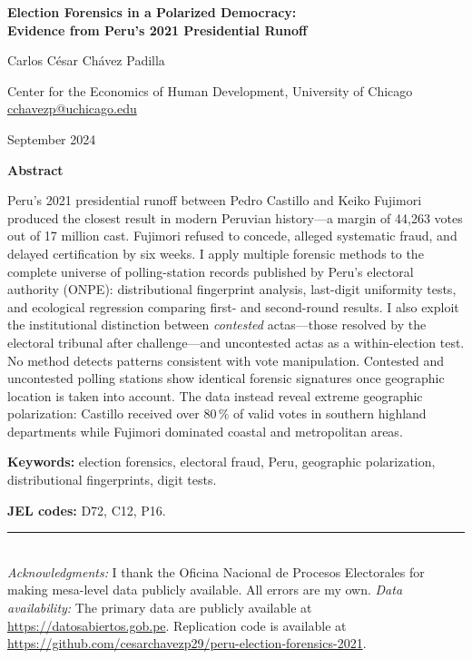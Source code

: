 \documentclass[12pt]{article}
\begin{document}
\thispagestyle{empty}

\begin{center}
\vspace*{1.5cm}
{\LARGE\bfseries Election Forensics in a Polarized Democracy:\\[10pt]
Evidence from Peru's 2021 Presidential Runoff\par}
\vspace{1.5cm}
{\large Carlos C\'esar Ch\'avez Padilla\par}
\vspace{0.4cm}
{\normalsize
  Center for the Economics of Human Development, University of Chicago\\[4pt]
  \href{mailto:cchavezp@uchicago.edu}{cchavezp@uchicago.edu}
\par}
\vspace{0.5cm}
{\normalsize September 2024\par}
\end{center}

\vspace{0.8cm}
\begin{center}\textbf{Abstract}\end{center}
\noindent\small
Peru's 2021 presidential runoff between Pedro Castillo and Keiko Fujimori
produced the closest result in modern Peruvian history---a margin of 44,263
votes out of 17 million cast. Fujimori refused to concede, alleged systematic
fraud, and delayed certification by six weeks. I apply multiple forensic
methods to the complete universe of polling-station records published by
Peru's electoral authority (ONPE): distributional fingerprint analysis,
last-digit uniformity tests, and ecological regression comparing first- and
second-round results. I also exploit the institutional distinction between
\emph{contested} actas---those resolved by the electoral tribunal after
challenge---and uncontested actas as a within-election test. No method
detects patterns consistent with vote manipulation. Contested and uncontested
polling stations show identical forensic signatures once geographic location
is taken into account. The data instead reveal extreme geographic polarization:
Castillo received over 80\,\% of valid votes in southern highland departments
while Fujimori dominated coastal and metropolitan areas.

\medskip
\noindent\textbf{Keywords:} election forensics, electoral fraud, Peru,
geographic polarization, distributional fingerprints, digit tests.

\medskip
\noindent\textbf{JEL codes:} D72, C12, P16.

\vfill
\noindent\rule{\textwidth}{0.4pt}\\[4pt]
{\footnotesize
\textit{Acknowledgments:}
I thank the Oficina Nacional de Procesos Electorales for making
mesa-level data publicly available. All errors are my own.
\textit{Data availability:} The primary data are publicly available
at \url{https://datosabiertos.gob.pe}. Replication code is available
at \url{https://github.com/cesarchavezp29/peru-election-forensics-2021}.}
\end{document}
